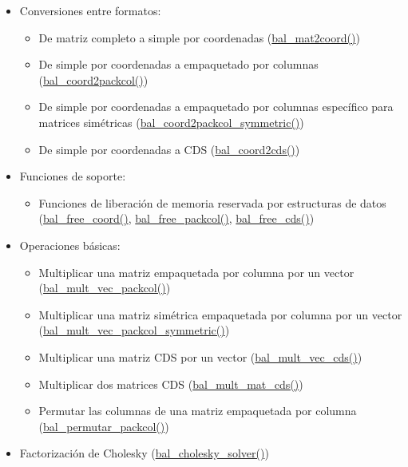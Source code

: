 \begin{itemize}
\begin{itemize}
\item Conversiones entre formatos: \begin{itemize}
\item De matriz completo a simple por coordenadas (\hyperlink{bal_8c_03258fb282226ce95701827d775bb011}{bal\_\-mat2coord()}) \item De simple por coordenadas a empaquetado por columnas (\hyperlink{bal_8c_6ced93fa5fb8f0a5103d8ee2e2bb58c2}{bal\_\-coord2packcol()}) \item De simple por coordenadas a empaquetado por columnas específico para matrices simétricas (\hyperlink{bal_8c_069fc47d55dc12786bae9f18382344e5}{bal\_\-coord2packcol\_\-symmetric()}) \item De simple por coordenadas a CDS (\hyperlink{bal_8c_26024ae0fd4f685b495f1e33a6e65da8}{bal\_\-coord2cds()}) \end{itemize}
\item Funciones de soporte: \begin{itemize}
\item Funciones de liberación de memoria reservada por estructuras de datos (\hyperlink{bal_8c_b3ce8c7df5d3d2a8eb9cd70534f628ed}{bal\_\-free\_\-coord()}, \hyperlink{bal_8c_ecd6ad512d46f1825e79eda4647eaf60}{bal\_\-free\_\-packcol()}, \hyperlink{bal_8c_7eae9c8721058a53a00d0c0dad2551f2}{bal\_\-free\_\-cds()}) \end{itemize}
\item Operaciones básicas: \begin{itemize}
\item Multiplicar una matriz empaquetada por columna por un vector (\hyperlink{bal_8c_413951b2a155feea5c67288a3ccb34bf}{bal\_\-mult\_\-vec\_\-packcol()}) \item Multiplicar una matriz simétrica empaquetada por columna por un vector (\hyperlink{bal_8c_dfee3769ca35f010759eddbf8e9cc476}{bal\_\-mult\_\-vec\_\-packcol\_\-symmetric()}) \item Multiplicar una matriz CDS por un vector (\hyperlink{bal_8c_73ce65d5fd284423c38517d6370f449e}{bal\_\-mult\_\-vec\_\-cds()}) \item Multiplicar dos matrices CDS (\hyperlink{bal_8c_1500ac2a006e9229a2a4fe810734367b}{bal\_\-mult\_\-mat\_\-cds()}) \item Permutar las columnas de una matriz empaquetada por columna (\hyperlink{bal_8c_cf73a00379402d81de059fe1af3c496a}{bal\_\-permutar\_\-packcol()}) \end{itemize}
\item Factorización de Cholesky (\hyperlink{bal_8c_c27eba96470b3ac5a5019230bd380a1a}{bal\_\-cholesky\_\-solver()}) \begin{itemize}

\end{itemize}
\end{itemize}
\end{itemize}
